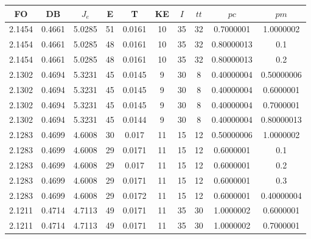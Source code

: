 \begin{table}[h!]
    \footnotesize
    \begin{center}
        \begin{tabular}{|c|c|c|c|c|c|c|c|c|c|}
        \hline
            {\bf FO} & {\bf DB} & $J_e$ & {\bf E} & {\bf T} & {\bf KE} & $I$ & $tt$ & $pc$ & $pm$ \\
        \hline
        \hline
            2.1454 & 0.4661  & 5.0285 & 51 & 0.0161 & 10 & 35 & 32 & 0.7000001 & 1.0000002\\
        \hline
        \hline
            2.1454 & 0.4661  & 5.0285 & 48 & 0.0161 & 10 & 35 & 32 & 0.80000013 & 0.1\\
        \hline
        \hline
            2.1454 & 0.4661  & 5.0285 & 48 & 0.0161 & 10 & 35 & 32 & 0.80000013 & 0.2\\
        \hline
        \hline
            2.1302 & 0.4694  & 5.3231 & 45 & 0.0145 & 9 & 30 & 8 & 0.40000004 & 0.50000006\\
        \hline
        \hline
            2.1302 & 0.4694  & 5.3231 & 45 & 0.0145 & 9 & 30 & 8 & 0.40000004 & 0.6000001\\
        \hline
        \hline
            2.1302 & 0.4694  & 5.3231 & 45 & 0.0145 & 9 & 30 & 8 & 0.40000004 & 0.7000001\\
        \hline
        \hline
            2.1302 & 0.4694  & 5.3231 & 45 & 0.0144 & 9 & 30 & 8 & 0.40000004 & 0.80000013\\
        \hline
        \hline
            2.1283 & 0.4699  & 4.6008 & 30 & 0.017 & 11 & 15 & 12 & 0.50000006 & 1.0000002\\
        \hline
        \hline
            2.1283 & 0.4699  & 4.6008 & 29 & 0.0171 & 11 & 15 & 12 & 0.6000001 & 0.1\\
        \hline
        \hline
            2.1283 & 0.4699  & 4.6008 & 29 & 0.017 & 11 & 15 & 12 & 0.6000001 & 0.2\\
        \hline
        \hline
            2.1283 & 0.4699  & 4.6008 & 29 & 0.0171 & 11 & 15 & 12 & 0.6000001 & 0.3\\
        \hline
        \hline
            2.1283 & 0.4699  & 4.6008 & 29 & 0.0172 & 11 & 15 & 12 & 0.6000001 & 0.40000004\\
        \hline
        \hline
            2.1211 & 0.4714  & 4.7113 & 49 & 0.0171 & 11 & 35 & 30 & 1.0000002 & 0.6000001\\
        \hline
        \hline
            2.1211 & 0.4714  & 4.7113 & 49 & 0.0171 & 11 & 35 & 30 & 1.0000002 & 0.7000001\\

\end{tabular}
\end{center}
\end{table}
